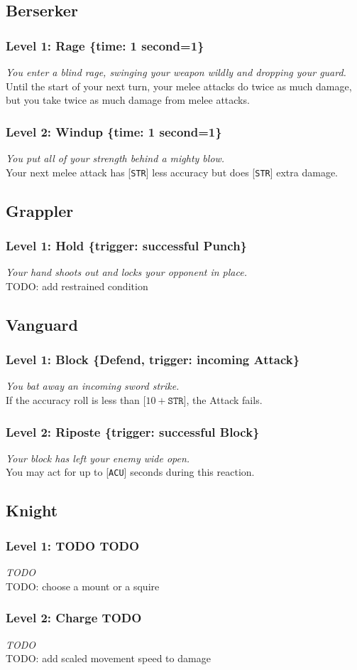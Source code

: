\documentclass[12pt]{article}
\newcommand{\STR}{\texttt{STR}}
\newcommand{\ACU}{\texttt{ACU}}
\newcommand{\TIME}[1]{\{time: #1 second\if1=#1{}\else{s}\fi\}}
\newcommand{\TRIG}[1]{\{trigger: #1\}}
\newcommand{\Defend}{\{Defend, trigger: incoming Attack\}}
\newcommand{\Class}[1]{\pagebreak\subsection{#1}\label{#1}}
\newcommand{\Skill}[5]{\subsubsection{Level #1: #2 #3}\textit{#4}\\[1mm]#5}
\begin{document}
\Class{Berserker}

\Skill{1}{Rage}{\TIME{1}}
{You enter a blind rage, swinging your weapon wildly and dropping your guard.}
{Until the start of your next turn, your melee attacks do twice as much damage, but you take twice as much damage from melee attacks.}

\Skill{2}{Windup}{\TIME{1}}
{You put all of your strength behind a mighty blow.}
{Your next melee attack has [\STR] less accuracy but does [\STR] extra damage.}

\Class{Grappler}

\Skill{1}{Hold}{\TRIG{successful Punch}}
{Your hand shoots out and locks your opponent in place.}
{TODO: add restrained condition}

\Class{Vanguard}

\Skill{1}{Block}{\Defend}
{You bat away an incoming sword strike.}
{If the accuracy roll is less than [$10 + \STR$], the Attack fails.}

\Skill{2}{Riposte}{\TRIG{successful Block}}
{Your block has left your enemy wide open.}
{You may act for up to [\ACU] seconds during this reaction.}

\Class{Knight}

\Skill{1}{TODO}{TODO}
{TODO}
{TODO: choose a mount or a squire}

\Skill{2}{Charge}{TODO}
{TODO}
{TODO: add scaled movement speed to damage}
\end{document}
